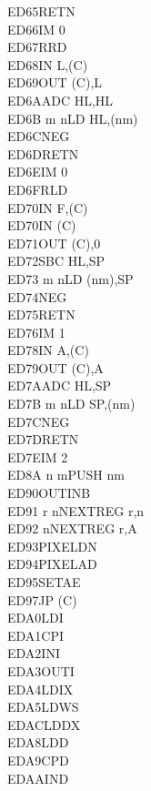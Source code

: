 \begin{multicols}{3}
{\begin{tabbing}
	ED65\>RETN\UNDOC\\
	ED66\>IM 0\UNDOC\\
	ED67\>RRD\\
	ED68\>IN L,(C)\\
	ED69\>OUT (C),L\\
	ED6A\>ADC HL,HL\\
	ED6B m n\>LD HL,(nm)\\
	ED6C\>NEG\UNDOC\\
	ED6D\>RETN\UNDOC\\
	ED6E\>IM 0\UNDOC\\
	ED6F\>RLD\\
	ED70\>IN F,(C)\UNDOC\\
	ED70\>IN (C)\UNDOC\\
	ED71\>OUT (C),0\UNDOC\\
	ED72\>SBC HL,SP\\
	ED73 m n\>LD (nm),SP\\
	ED74\>NEG\UNDOC\\
	ED75\>RETN\UNDOC\\
	ED76\>IM 1\UNDOC\\
	ED78\>IN A,(C)\\
	ED79\>OUT (C),A\\
	ED7A\>ADC HL,SP\\
	ED7B m n\>LD SP,(nm)\\
	ED7C\>NEG\UNDOC\\
	ED7D\>RETN\UNDOC\\
	ED7E\>IM 2\UNDOC\\
	ED8A n m\>PUSH nm\ZXN\\
	ED90\>OUTINB\ZXN\\
	ED91 r n\>NEXTREG r,n\ZXN\\
	ED92 n\>NEXTREG r,A\ZXN\\
	ED93\>PIXELDN\ZXN\\
	ED94\>PIXELAD\ZXN\\
	ED95\>SETAE\ZXN\\
	ED97\>JP (C)\ZXN\\
	EDA0\>LDI\\
	EDA1\>CPI\\
	EDA2\>INI\\
	EDA3\>OUTI\\
	EDA4\>LDIX\ZXN\\
	EDA5\>LDWS\ZXN\\
	EDAC\>LDDX\ZXN\\
	EDA8\>LDD\\
	EDA9\>CPD\\
	EDAA\>IND\\

\end{tabbing}}
\end{multicols}
